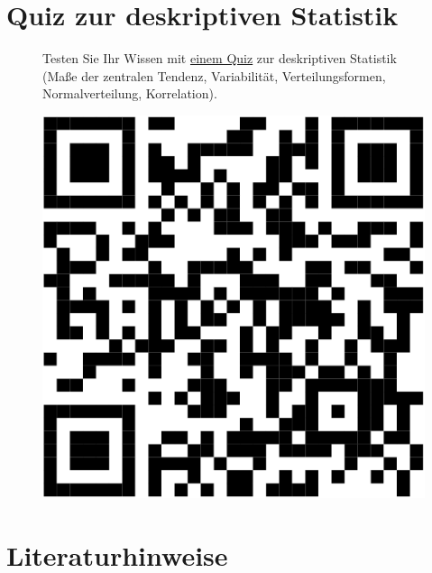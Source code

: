 \documentclass[
  letterpaper,
  twoside,
  open=any]{scrbook}
\theoremstyle{definition}
\theoremstyle{definition}
\theoremstyle{definition}
\theoremstyle{remark}
\begin{document}
\section{Quiz zur deskriptiven
Statistik}\label{quiz-zur-deskriptiven-statistik}

\begin{figure}

\begin{minipage}{0.80\linewidth}
Testen Sie Ihr Wissen mit
\href{https://forms.gle/w7eTW3ftKy8Hv3nw8}{einem Quiz} zur deskriptiven
Statistik (Maße der zentralen Tendenz, Variabilität, Verteilungsformen,
Normalverteilung, Korrelation).\end{minipage}%
%
\begin{minipage}{0.20\linewidth}

\begin{center}
\includegraphics[width=0.75\linewidth,height=\textheight,keepaspectratio]{070-zusammenhaenge_files/figure-pdf/unnamed-chunk-31-1.pdf}
\end{center}

\end{minipage}%

\end{figure}%

\section{Literaturhinweise}\label{literaturhinweise-6}
\end{document}
